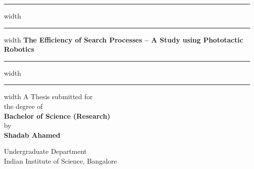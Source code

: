 \documentclass[12pt]{report}
\begin{document}
  \begin{titlepage}
		\begin{center}
		    \vspace*{8ex}
			\hrule width \hsize \kern 1mm \hrule width \hsize
			\vspace{20pt} 
			\Large{\textbf{The Efficiency of Search Processes -- A Study using Phototactic Robotics }} %
			\vspace{20pt} 
			\hrule width \hsize \kern 1mm \hrule width \hsize
			 \vspace{25pt}
			{A Thesis submitted for}\\
			 the degree of  \\
			
			\vspace*{15pt}
			\large{\textbf{Bachelor of Science (Research)}}\\ 
			\vspace*{10pt}
			by\\
			\vspace*{15pt}
			\large{\textbf{Shadab Ahamed}}\\
			\begin{normalsize}
			Undergraduate Department\\
			Indian Institute of Science, Bangalore
			\end{normalsize}
			\vspace*{50pt}\\
		

\end{center}
\end{titlepage}
\end{document}
